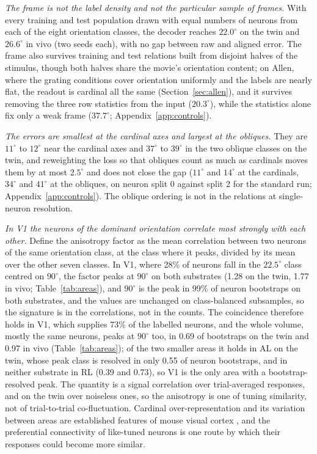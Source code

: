 \documentclass[11pt]{article}
\begin{document}
\emph{The frame is not the label density and not the particular sample of frames.} With every training and test population drawn with equal numbers of neurons from each of the eight orientation classes, the decoder reaches $22.0^\circ$ on the twin and $26.6^\circ$ in vivo (two seeds each), with no gap between raw and aligned error. The frame also survives training and test relations built from disjoint halves of the stimulus, though both halves share the movie's orientation content; on Allen, where the grating conditions cover orientation uniformly and the labels are nearly flat, the readout is cardinal all the same (Section~\ref{sec:allen}), and it survives removing the three row statistics from the input ($20.3^\circ$), while the statistics alone fix only a weak frame ($37.7^\circ$; Appendix~\ref{app:controls}).

\emph{The errors are smallest at the cardinal axes and largest at the obliques.} They are $11^\circ$ to $12^\circ$ near the cardinal axes and $37^\circ$ to $39^\circ$ in the two oblique classes on the twin, and reweighting the loss so that obliques count as much as cardinals moves them by at most $2.5^\circ$ and does not close the gap ($11^\circ$ and $14^\circ$ at the cardinals, $34^\circ$ and $41^\circ$ at the obliques, on neuron split 0 against split 2 for the standard run; Appendix~\ref{app:controls}). The oblique ordering is not in the relations at single-neuron resolution.

\emph{In V1 the neurons of the dominant orientation correlate most strongly with each other.} Define the anisotropy factor as the mean correlation between two neurons of the same orientation class, at the class where it peaks, divided by its mean over the other seven classes. In V1, where 28\% of neurons fall in the $22.5^\circ$ class centred on $90^\circ$, the factor peaks at $90^\circ$ on both substrates (1.28 on the twin, 1.77 in vivo; Table~\ref{tab:areas}), and $90^\circ$ is the peak in 99\% of neuron bootstraps on both substrates, and the values are unchanged on class-balanced subsamples, so the signature is in the correlations, not in the counts. The coincidence therefore holds in V1, which supplies 73\% of the labelled neurons, and the whole volume, mostly the same neurons, peaks at $90^\circ$ too, in 0.69 of bootstraps on the twin and 0.97 in vivo (Table~\ref{tab:areas}); of the two smaller areas it holds in AL on the twin, whose peak class is resolved in only 0.55 of neuron bootstraps, and in neither substrate in RL (0.39 and 0.73), so V1 is the only area with a bootstrap-resolved peak. The quantity is a signal correlation over trial-averaged responses, and on the twin over noiseless ones, so the anisotropy is one of tuning similarity, not of trial-to-trial co-fluctuation. Cardinal over-representation and its variation between areas are established features of mouse visual cortex \citep{roth2012,fahey2019}, and the preferential connectivity of like-tuned neurons \citep{ko2011} is one route by which their responses could become more similar.
\end{document}
